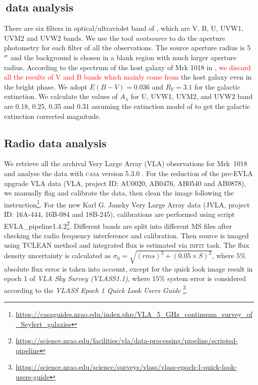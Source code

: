 \subsection{\uvot\,data analysis}
\label{sec:uvot}
There are six filters in optical/ultraviolet band of \uvot, which are V, B, U, UVW1, UVM2 and UVW2 bands. We use the tool \textit{uvotsource} to do the aperture photometry for each filter of all the observations. The source aperture radius is 5$\hbox{$^{\prime\prime}$}$ and the background is chosen in a blank region with much larger aperture radius. According to the spectrum of the host galaxy of Mrk 1018 in \citep{2018MNRAS.480.3898N}, \textcolor{red}{we discard all the results of V and B bands which mainly come from} the host galaxy even in the bright phase. We adopt $E(B-V) = 0.036$ \citep[see][]{2018MNRAS.480.3898N} and $R_{V}=3.1$ for the galactic extinction. We calculate the values of $A_{\lambda}$ for U, UVW1, UVM2, and UVW2 band are  0.18, 0.25, 0.35 and 0.31 assuming the extinction model of \citet{2007ApJ...663..320F} to get the galactic extinction corrected magnitude. 




\subsection{Radio data analysis}
\label{subsec:vla}
We retrieve all the archival Very Large Array (VLA) observations for Mrk~1018 and analyse the data with \textsc{casa} version 5.3.0 \citep{2007ASPC..376..127M}. For the reduction of the pre-EVLA upgrade VLA data (VLA, project ID: AU0020, AB0476, AB0540 and AB0878), we manually flag and calibrate the data, then clean the image following the instruction\footnote{\url{https://casaguides.nrao.edu/index.php/VLA_5_GHz_continuum_survey_of_Seyfert_galaxies}}. For the new Karl G. Jansky Very Large Array data (JVLA, project ID: 16A-444, 16B-084 and 18B-245), calibrations are performed using script {EVLA\_pipeline1.4.2}\footnote{\url{https://science.nrao.edu/facilities/vla/data-processing/pipeline/scripted-pipeline}}. Different bands are split into different MS files after checking the radio frequency interference and calibration. Then source is imaged using {\scriptsize TCLEAN} method and integrated flux is estimated via \textsc{imfit} task. The flux density uncertainty is calculated as $\sigma_\mathrm{S}=\sqrt{(rms)^2+(0.05\times S)^2}$, where $5 \%$ absolute flux error is taken into account, except for the quick look image result in epoch 1 of  {\em VLA Sky Survey (VLASS1.1)}, where $15 \%$ system error is considered according to the {\em VLASS Epoch 1 Quick Look Users Guide} \footnote{\url{https://science.nrao.edu/science/surveys/vlass/vlass-epoch-1-quick-look-users-guide}}. 

